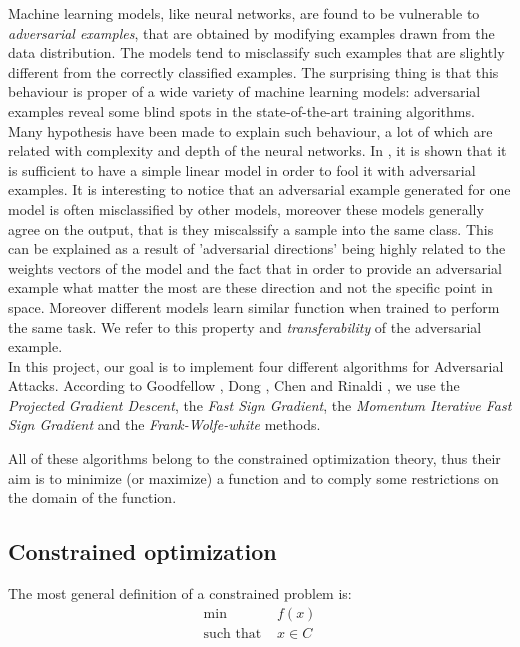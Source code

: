 \documentclass[10pt,twocolumn,letterpaper, english]{article}
\theoremstyle{definition}
\theoremstyle{plain}
\theoremstyle{plain}
\theoremstyle{plain}
\theoremstyle{plain}
\theoremstyle{remark}
\theoremstyle{remark}
\theoremstyle{definition}
\theoremstyle{definition}
\theoremstyle{definition}
\theoremstyle{definition}
\begin{document}
Machine learning models, like neural networks, are found to be vulnerable to \textit{adversarial examples}, that are obtained by modifying examples drawn from the data distribution. 
The models tend to misclassify such examples that are slightly different from the correctly classified examples. 
The surprising thing is that this behaviour is proper of a wide variety of machine learning models: adversarial examples reveal some blind spots in the state-of-the-art training algorithms. \\

Many hypothesis have been made to explain such behaviour, a lot of which are related with complexity and depth of the neural networks. 
In \cite{goodfellow}, it is shown that it is sufficient to have a simple linear model in order to fool it with adversarial examples. It is interesting to notice that an adversarial example generated for one model is often misclassified by other models, moreover these models generally agree on the output, that is they miscalssify a sample into the same class. This can be explained as a result of 'adversarial directions' being highly related to the weights vectors of the model and the fact that in order to provide an adversarial example what matter the most are these direction and not the specific point in space. Moreover different models learn similar function when trained to perform the same task. We refer to this property and \textit{transferability} of the adversarial example. \\ 

In this project, our goal is to implement four different algorithms for Adversarial Attacks. 
According to Goodfellow \cite{goodfellow}, Dong \cite{momentum}, Chen \cite{frank} and Rinaldi \cite{rinaldi}, we use the \textit{Projected Gradient Descent}, the \textit{Fast Sign Gradient}, the \textit{Momentum Iterative Fast Sign Gradient} and the \textit{Frank-Wolfe-white} methods. 

All of these algorithms belong to the constrained optimization theory, thus their aim is to minimize (or maximize) a function and to comply some restrictions on the domain of the function. 

\subsection{Constrained optimization}

The most general definition of a constrained problem is: 
\begin{align}
    \min \,&f(x) \label{min_prob} \\
    \text{such that } &x \in C \nonumber
\end{align}
\end{document}

